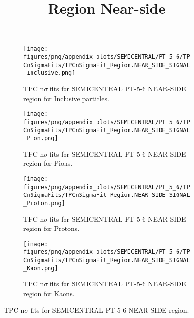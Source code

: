             \begin{figure}[H]
                \title{Region Near-side}
                \begin{subfigure}[b]{0.5\textwidth}
                    \centering
                    \texttt{[image: figures/png/appendix\_plots/SEMICENTRAL/PT\_5\_6/TPCnSigmaFits/TPCnSigmaFit\_Region.NEAR\_SIDE\_SIGNAL\_Inclusive.png]}
                    \caption{TPC n$\sigma$ fits for SEMICENTRAL PT-5-6 NEAR-SIDE region for Inclusive particles.}
                    \label{fig:appendix_SEMICENTRAL_PT-5-6_NEAR_SIDE_SIGNAL_Inclusive}
                \end{subfigure}
                \begin{subfigure}[b]{0.5\textwidth}
                    \centering
                    \texttt{[image: figures/png/appendix\_plots/SEMICENTRAL/PT\_5\_6/TPCnSigmaFits/TPCnSigmaFit\_Region.NEAR\_SIDE\_SIGNAL\_Pion.png]}
                    \caption{TPC n$\sigma$ fits for SEMICENTRAL PT-5-6 NEAR-SIDE region for Pions.}
                    \label{fig:appendix_SEMICENTRAL_PT-5-6_NEAR_SIDE_SIGNAL_Pion}
                \end{subfigure}
                \begin{subfigure}[b]{0.5\textwidth}
                    \centering
                    \texttt{[image: figures/png/appendix\_plots/SEMICENTRAL/PT\_5\_6/TPCnSigmaFits/TPCnSigmaFit\_Region.NEAR\_SIDE\_SIGNAL\_Proton.png]}
                    \caption{TPC n$\sigma$ fits for SEMICENTRAL PT-5-6 NEAR-SIDE region for Protons.}
                    \label{fig:appendix_SEMICENTRAL_PT-5-6_NEAR_SIDE_SIGNAL_Proton}
                \end{subfigure}
                \begin{subfigure}[b]{0.5\textwidth}
                    \centering
                    \texttt{[image: figures/png/appendix\_plots/SEMICENTRAL/PT\_5\_6/TPCnSigmaFits/TPCnSigmaFit\_Region.NEAR\_SIDE\_SIGNAL\_Kaon.png]}
                    \caption{TPC n$\sigma$ fits for SEMICENTRAL PT-5-6 NEAR-SIDE region for Kaons.}
                    \label{fig:appendix_SEMICENTRAL_PT-5-6_NEAR_SIDE_SIGNAL_Kaon}
                \end{subfigure}
                \caption{TPC n$\sigma$ fits for SEMICENTRAL PT-5-6 NEAR-SIDE region.}
                \label{fig:appendix_SEMICENTRAL_PT-5-6_NEAR_SIDE_SIGNAL}
            \end{figure}
